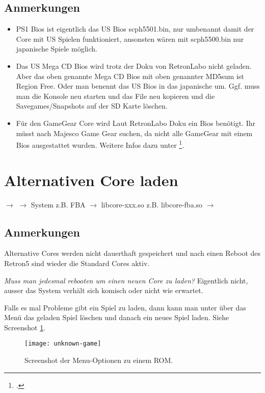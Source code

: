 \documentclass[german]{retronlabo-manual}
\begin{document}
\subsection{Anmerkungen}

\begin{itemize}
  \item PS1 Bios ist eigentlich das US Bios scph5501.bin, nur umbenannt damit der Core mit US Spielen funktioniert, ansonsten w\"aren mit scph5500.bin nur japanische Spiele m\"oglich.
  \item Das US Mega CD Bios wird trotz der Doku von RetronLabo nicht geladen. Aber das oben genannte Mega CD Bios mit oben genannter MD5sum ist Region Free. Oder man benennt das US Bios in das japanische um. Ggf. muss man die Konsole neu starten und das File neu kopieren und die Savegames/Snapshots auf der SD Karte l\"oschen.
  \item F\"ur den GameGear Core wird Laut RetronLabo Doku ein Bios ben\"otigt. Ihr m\"usst nach Majesco Game Gear suchen, da nicht alle GameGear mit einem Bios ausgestattet wurden. Weitere Infos dazu unter \footcite{ref:smsp-bios}.
\end{itemize}

\section{Alternativen Core laden}

 $\rightarrow$  $\rightarrow$ System z.B. FBA $\rightarrow$ libcore-xxx.so z.B. libcore-fba.so $\rightarrow$ 

\subsection{Anmerkungen}

Alternative Cores werden nicht dauerthaft gespeichert und nach einen Reboot des Retron5 sind wieder die Standard Cores aktiv.

\emph{Muss man jedesmal rebooten um einen neuen Core zu laden?} Eigentlich nicht, ausser das System verh\"alt sich komisch oder nicht wie erwartet.

Falls es mal Probleme gibt ein Spiel zu laden, dann kann man unter  \"uber das Men\"u das geladen Spiel l\"oschen und danach ein neues Spiel laden. Siehe Screenshot \ref{fig:unknown-game}.

\begin{figure}[h]
\caption{Screenshot der Menu-Optionen zu einem ROM.}
\texttt{[image: unknown-game]}
\label{fig:unknown-game}
\end{figure}
\end{document}
